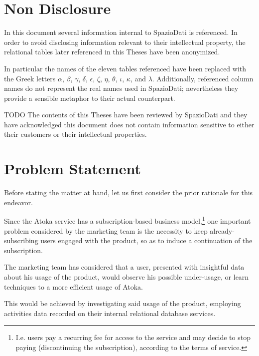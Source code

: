 \section{Non Disclosure}
\label{sec:non-disclosure}

In this document several information internal to SpazioDati is referenced.
In order to avoid disclosing information relevant to their intellectual property, the relational tables later referenced in this Theses have been anonymized.

In particular the names of the eleven tables referenced have been replaced with the Greek letters $\alpha$, $\beta$, $\gamma$, $\delta$, $\epsilon$, $\zeta$, $\eta$, $\theta$, $\iota$, $\kappa$, and $\lambda$.
Additionally, referenced column names do not represent the real names used in SpazioDati; nevertheless they provide a sensible metaphor to their actual counterpart. 

TODO
The contents of this Theses have been reviewed by SpazioDati and they have acknowledged this document does not contain information sensitive to either their customers or their intellectual properties.


\section{Problem Statement}
\label{sec:problem-statement}

Before stating the matter at hand, let us first consider the prior rationale for this endeavor.

Since the Atoka service has a subscription-based business model,\footnote{%
I.e. users pay a recurring fee for access to the service and may decide to stop paying (discontinuing the subscription), according to the terms of service.
} one important problem considered by the marketing team is the necessity to keep already-subscribing users engaged with the product, so as to induce a continuation of the subscription.

The marketing team has considered that a user, presented with insightful data about his usage of the product, would observe his possible under-usage, or learn techniques to a more efficient usage of Atoka.

This would be achieved by investigating said usage of the product, employing activities data recorded on their internal relational database services.

